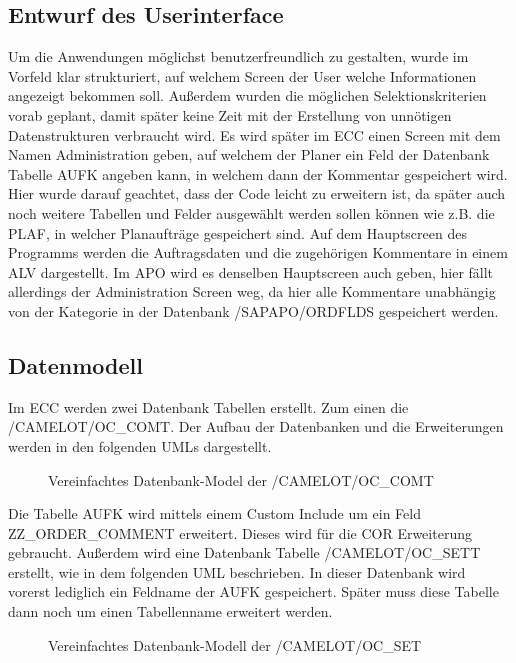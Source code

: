 \subsection{Entwurf des Userinterface}
\label{sec:Benutzeroberflaeche} 
Um die Anwendungen möglichst benutzerfreundlich zu gestalten, wurde im Vorfeld klar strukturiert, auf welchem Screen der User welche Informationen angezeigt bekommen soll. Außerdem wurden die möglichen Selektionskriterien vorab geplant, damit später keine Zeit mit der Erstellung von unnötigen Datenstrukturen verbraucht wird. Es wird später im \ac{ECC} einen Screen mit dem Namen Administration geben, auf welchem der Planer ein Feld der Datenbank Tabelle AUFK angeben kann, in welchem dann der Kommentar gespeichert wird. Hier wurde darauf geachtet, dass der Code leicht zu erweitern ist, da später auch noch weitere Tabellen und Felder ausgewählt werden sollen können wie z.B. die PLAF, in welcher Planaufträge gespeichert sind. Auf dem Hauptscreen des Programms werden die Auftragsdaten und die zugehörigen Kommentare in einem \ac{ALV} dargestellt. Im \ac{APO} wird es denselben Hauptscreen auch geben, hier fällt allerdings der Administration Screen weg, da hier alle Kommentare unabhängig von der Kategorie in der Datenbank /SAPAPO/ORDFLDS gespeichert werden. 

\subsection{Datenmodell}
\label{sec:Datenmodell}
Im ECC werden zwei Datenbank Tabellen erstellt. Zum einen die /CAMELOT/OC\_COMT. Der Aufbau der Datenbanken und die Erweiterungen werden in den folgenden \ac{UML}s dargestellt.

\begin{figure}[htb]
\centering
{}
\caption{Vereinfachtes Datenbank-Model der /CAMELOT/OC\_COMT}
\label{fig:ECC01}
\end{figure} 

Die Tabelle AUFK wird mittels einem Custom Include um ein Feld \textsc{ZZ\_ORDER\_COMMENT} erweitert. Dieses wird für die COR Erweiterung gebraucht. Außerdem wird eine Datenbank Tabelle \textsc{/CAMELOT/OC\_SETT} erstellt, wie in dem folgenden \ac{UML} beschrieben. In dieser Datenbank wird vorerst lediglich ein Feldname der AUFK gespeichert. Später muss diese Tabelle dann noch um einen Tabellenname erweitert werden.

\begin{figure}[htb]
	\centering
	\caption{Vereinfachtes Datenbank-Modell der /CAMELOT/OC\_SET}
	\label{fig:ECC02}
\end{figure} 

